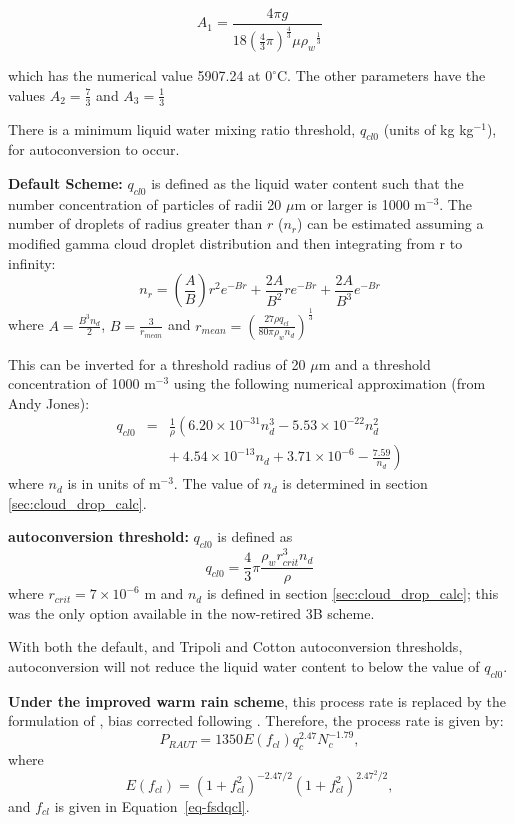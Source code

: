 \documentclass{UMDP_article}
\def\bq{\begin{equation}}
\def\eq{\end{equation}}
\begin{document}
\bq
A_1 = \frac{4 \pi g}{18 {\left(\frac{4}{3} \pi \right)}^{\frac{4}{3}} 
\mu {\rho_{w}}^{\frac{1}{3}}}
\eq

which has the numerical value 5907.24 at $0^{\circ}$C. The other parameters have the
values $A_2 = \frac{7}{3}$ and $A_3=\frac{1}{3}$

There is
a minimum liquid water mixing ratio threshold, $q_{cl0}$ (units of kg kg$^{-1}$), 
for autoconversion to occur. 

\textbf{Default Scheme:}
$q_{cl0}$ is
defined as the liquid water content such that the number concentration of
particles of radii 20 $\mu$m or larger is 1000 m$^{-3}$. The number of droplets
of radius greater than $r$ ($n_r$) can be estimated assuming a modified gamma 
cloud droplet distribution \citep{pruppacher:klett} and then integrating from r to
infinity:
\bq
n_r = \left(\frac{A}{B}\right) r^2 e^{-Br} + \frac{2A}{B^2} r e^{-Br} 
+ \frac{2A}{B^3} e ^{-Br}
\eq
where $A = \frac{B^3 n_d}{2}$, $B=\frac{3}{r_{mean}}$ and 
$r_{mean}= {\left( \frac{27 \rho q_{cl}}{80 \pi \rho_{w} n_d} \right)}^{\frac{1}{3}}$

This can be inverted for a threshold radius of 20 $\mu$m and a threshold 
concentration of 1000 m$^{-3}$ using the following numerical approximation 
(from Andy Jones): 
\begin{eqnarray}
\label{eq:jones_nd}
q_{cl0} &=& \frac{1}{\rho} \left(6.20\times10^{-31} n_d^3 - 5.53\times10^{-22} n_d^2 
\right. 
\nonumber \\
& & \left. + ~4.54\times10^{-13} n_d + 3.71\times10^{-6} - \frac{7.59}{n_d} \right)
\end{eqnarray}
where $n_d$ is in units of m$^{-3}$. The value of $n_d$ is determined in section
\ref{sec:cloud_drop_calc}.

\textbf{\cite{Tripoli:Cotton:1980} autoconversion threshold:}
$q_{cl0}$ is
defined as
\bq
\label{eq:tc_act}
q_{cl0} = \frac{4}{3} \pi \frac{\rho_{w} r^3_{crit} n_d}{\rho}
\eq
where $r_{crit} = 7 \times 10^{-6}$ m and $n_d$ is defined in section 
\ref{sec:cloud_drop_calc}; this was the only option available in the now-retired 
3B scheme.

With both the default, and Tripoli and Cotton autoconversion thresholds, 
autoconversion will not reduce the liquid water content to below the value 
of $q_{cl0}$.

{\bf Under the improved warm rain scheme}, this process rate is
replaced by the formulation of \cite{Khair:Kogan:2000}, bias corrected
following \cite{boutle:etal:2014}. Therefore, the process rate is
given by:
\begin{equation}
P_{RAUT}=1350E(f_{cl})q_c^{2.47}N_c^{-1.79},
\end{equation}
where
\begin{equation}
E(f_{cl})=(1+f_{cl}^2)^{-2.47/2}(1+f_{cl}^2)^{2.47^2/2},
\end{equation}
and $f_{cl}$ is given in Equation~\ref{eq-fsdqcl}.
\end{document}
